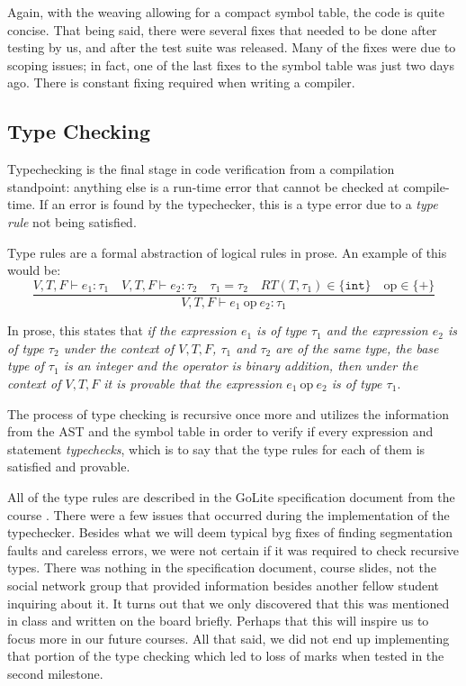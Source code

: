 \documentclass{article}
\begin{document}
Again, with the weaving allowing for a compact symbol table, the code is quite concise. That being said, there were several fixes that needed to be done after testing by us, and after the test suite was released. Many of the fixes were due to scoping issues; in fact, one of the last fixes to the symbol table was just two days ago. There is constant fixing required when writing a compiler.

\subsection{Type Checking}

Typechecking is the final stage in code verification from a compilation standpoint: anything else is a run-time error that cannot be checked at compile-time. If an error is found by the typechecker, this is a type error due to a \textit{type rule} not being satisfied.

Type rules are a formal abstraction of logical rules in prose. An example of this would be:
\[
    \frac{V, T, F \vdash e_1 : \tau_1 \quad V, T, F \vdash e_2 : \tau_2 \quad \tau_1 = \tau_2 \quad RT(T, \tau_1) \in \{\texttt{int}\} \quad \text{op} \in \{\texttt{+}\}}{V, T, F \vdash e_1 \ \text{op} \ e_2 : \tau_1}
\]

In prose, this states that \textit{if the expression $e_1$ is of type $\tau_1$ and the expression $e_2$ is of type $\tau_2$ under the context of $V, T, F$, $\tau_1$ and $\tau_2$ are of the same type, the base type of $\tau_1$ is an integer and the operator is binary addition, then under the context of $V, T, F$ it is provable that the expression $e_1 \ \text{op} \ e_2$ is of type $\tau_1$}.

The process of type checking is recursive once more and utilizes the information from the AST and the symbol table in order to verify if every expression and statement \textit{typechecks}, which is to say that the type rules for each of them is satisfied and provable.

All of the type rules are described in the GoLite specification document from the course \cite{VincentGoLite}. There were a few issues that occurred during the implementation of the typechecker. Besides what we will deem typical byg fixes of finding segmentation faults and careless errors, we were not certain if it was required to check recursive types. There was nothing in the specification document, course slides, not the social network group that provided information besides another fellow student inquiring about it. It turns out that we only discovered that this was mentioned in class and written on the board briefly. Perhaps that this will inspire us to focus more in our future courses. All that said, we did not end up implementing that portion of the type checking which led to loss of marks when tested in the second milestone. 
\end{document}
